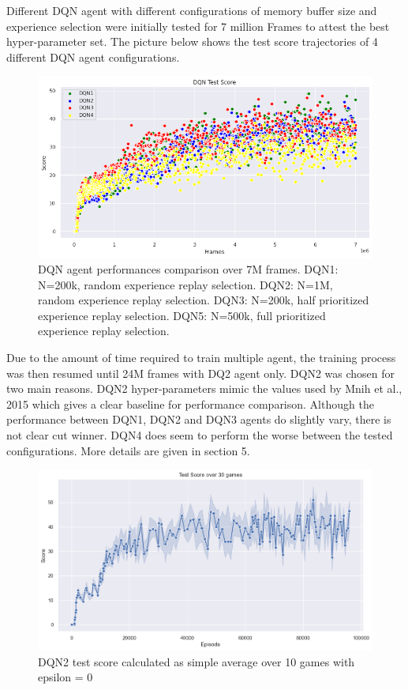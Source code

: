 \documentclass{article}
\begin{document}
Different DQN agent with different configurations of memory buffer size and experience selection were initially tested for 7 million Frames to attest the best hyper-parameter set. The picture below shows the test score trajectories of 4 different DQN agent configurations. 
\begin{figure}[H]
\includegraphics[scale=0.5]{DQNAgentComparison.PNG}
\caption[width=0.7\textwidth]{DQN agent performances comparison over 7M frames. DQN1: N=200k, random experience replay selection. DQN2: N=1M, random experience replay selection. DQN3: N=200k, half prioritized experience replay selection. DQN5: N=500k, full prioritized experience replay selection.}
\label{fig:DQNAgentComparison}
\end{figure}

Due to the amount of time required to train multiple agent, the training process was then resumed until 24M frames with DQ2 agent only. DQN2 was chosen for two main reasons. DQN2 hyper-parameters mimic the values used by Mnih et al., 2015 which gives a clear baseline for performance comparison. Although the performance between DQN1, DQN2 and DQN3 agents do slightly vary, there is not clear cut winner. DQN4 does seem to perform the worse between the tested configurations. More details are given in section 5.

\begin{figure}[H]
\includegraphics[scale=0.5]{DQNTestScoreNew.PNG}
\caption[width=0.7\textwidth]{DQN2 test score calculated as simple average over 10 games with epsilon = 0}
\label{fig:DQNTestScore}
\end{figure}
\end{document}
